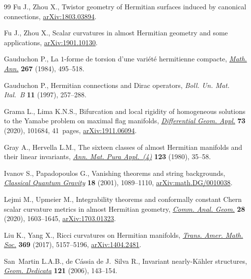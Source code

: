 \begin{thebibliography}{99}
Fu J., Zhou X., Twistor geometry of Hermitian surfaces induced by canonical
 connections, \href{https://arxiv.org/abs/1803.03894}{arXiv:1803.03894}.

Fu J., Zhou X., Scalar curvatures in almost Hermitian geometry and some
 applications, \href{https://arxiv.org/abs/1901.10130}{arXiv:1901.10130}.

Gauduchon P., La {$1$}-forme de torsion d'une vari\'et\'e hermitienne compacte,
 \href{https://doi.org/10.1007/BF01455968}{\textit{Math. Ann.}} \textbf{267} (1984), 495--518.

Gauduchon P., Hermitian connections and {D}irac operators, \textit{Boll. Un.
 Mat. Ital.~B} \textbf{11} (1997), 257--288.

Grama L., Lima K.N.S., Bifurcation and local rigidity of homogeneous solutions
 to the {Y}amabe problem on maximal flag manifolds, \href{https://doi.org/10.1016/j.difgeo.2020.101684}{\textit{Differential Geom.
 Appl.}} \textbf{73} (2020), 101684, 41~pages, \href{https://arxiv.org/abs/1911.06094}{arXiv:1911.06094}.

Gray A., Hervella L.M., The sixteen classes of almost {H}ermitian manifolds and
 their linear invariants, \href{https://doi.org/10.1007/BF01796539}{\textit{Ann. Mat. Pura Appl.~(4)}} \textbf{123}
 (1980), 35--58.

Ivanov S., Papadopoulos G., Vanishing theorems and string backgrounds,
 \href{https://doi.org/10.1088/0264-9381/18/6/309}{\textit{Classical Quantum Gravity}} \textbf{18} (2001), 1089--1110,
 \href{https://arxiv.org/abs/math.DG/0010038}{arXiv:math.DG/0010038}.

Lejmi M., Upmeier M., Integrability theorems and conformally constant {C}hern
 scalar curvature metrics in almost {H}ermitian geometry, \href{https://doi.org/10.4310/CAG.2020.v28.n7.a4}{\textit{Comm. Anal.
 Geom.}} \textbf{28} (2020), 1603--1645, \href{https://arxiv.org/abs/1703.01323}{arXiv:1703.01323}.

Liu K., Yang X., Ricci curvatures on {H}ermitian manifolds, \href{https://doi.org/10.1090/tran/7000}{\textit{Trans.
 Amer. Math. Soc.}} \textbf{369} (2017), 5157--5196, \href{https://arxiv.org/abs/1404.2481}{arXiv:1404.2481}.

San~Martin L.A.B., de C\'assia de J.~Silva R., Invariant nearly-{K}\"ahler structures,
 \href{https://doi.org/10.1007/s10711-006-9095-7}{\textit{Geom. Dedicata}} \textbf{121} (2006), 143--154.


\end{thebibliography}
